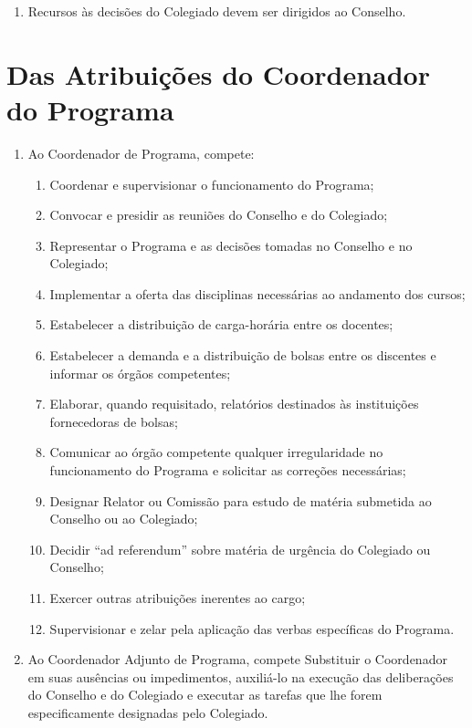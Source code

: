 \documentclass{article}
\newcommand{\singleitem}{\item[Parágrafo Único.]}
\newcommand{\grupoMenor}{Colegiado\xspace}
\newcommand{\grupoMaior}{Conselho\xspace}
\begin{document}
\begin{enumerate}
	\begin{enumerate}
		\singleitem Recursos às decisões do \grupoMenor devem ser dirigidos ao \grupoMaior.
	\end{enumerate}
\end{enumerate}

\section{Das Atribuições do Coordenador do Programa}
\begin{enumerate}
	\item Ao Coordenador de Programa, compete:
	\begin{enumerate}[label=\Roman*]
		\item Coordenar e supervisionar o funcionamento do Programa;
		\item Convocar e presidir as reuniões do \grupoMaior e do \grupoMenor;
		\item Representar o Programa e as decisões tomadas no \grupoMaior e no \grupoMenor;
		\item Implementar a oferta das disciplinas necessárias ao andamento dos cursos;
		\item Estabelecer a distribuição de carga-horária entre os docentes;
		\item Estabelecer a demanda e a distribuição de bolsas entre os discentes e informar os órgãos competentes;
		\item Elaborar, quando requisitado, relatórios destinados às instituições fornecedoras de bolsas;
		\item Comunicar ao órgão competente qualquer irregularidade no funcionamento do Programa e solicitar as correções necessárias;
		\item Designar Relator ou Comissão para estudo de matéria submetida ao \grupoMaior ou ao \grupoMenor;
		\item Decidir ``ad referendum'' sobre matéria de urgência do \grupoMenor ou \grupoMaior;
		\item Exercer outras atribuições inerentes ao cargo;
		\item Supervisionar e zelar pela aplicação das verbas específicas do Programa.
	\end{enumerate}
	\item Ao Coordenador Adjunto de Programa, compete Substituir o Coordenador em suas ausências ou impedimentos, auxiliá-lo na execução das deliberações do \grupoMaior e do \grupoMenor e executar as tarefas que lhe forem especificamente designadas pelo \grupoMenor.
\end{enumerate}
\end{document}
